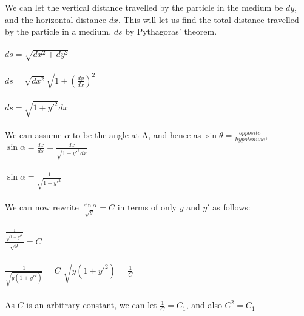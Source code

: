 \documentclass[12pt]{report}
\begin{document}
\\
\\
We can let the vertical distance travelled by the particle in the medium be \(dy\), and the horizontal distance \(dx\). This will let us find the total distance travelled by the particle in a medium, \(ds\) by Pythagoras' theorem.
\\
\\
\(ds = \sqrt{dx^2+dy^2}\)
\\
\\
\(ds = \sqrt{dx^2}\sqrt{1+(\frac{dy}{dx})^2}\)
\\
\\
\(ds = \sqrt{1+y'^2}dx\)
\\
\\
We can assume \(\alpha\) to be the angle at A, and hence as \(\sin{\theta} = \frac{opposite}{hypotenuse}\), \(\sin{\alpha} = \frac{dx}{ds} = \frac{dx}{\sqrt{1+y'^2}dx}\)
\\
\\
\implies \(\sin{\alpha} = \frac{1}{\sqrt{1+y'^2}}\)
\\
\\
We can now rewrite \(\frac{\sin{\alpha}}{\sqrt{y}} = C\) in terms of only \(y\) and \(y'\) as follows:
\\
\\
\(\frac{\frac{1}{\sqrt{1+y'^2}}}{\sqrt{y}} = C\)
\\
\\
\implies \(\frac{1}{\sqrt{y(1+y'^2)}} = C\) \implies \(\sqrt{y(1+y'^2)} = \frac{1}{C}\)
\\
\\
As \(C\) is an arbitrary constant, we can let \(\frac{1}{C} = C_{1}\), and also \(C^2 = C_{1}\)
\end{document}
